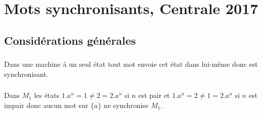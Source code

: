 
\usepackage{enumitem}
\def\numero{Révisions 4}
\def\classe{Option info MP1}
\renewcommand*{\arraystretch}{1.2}
\usetikzlibrary[automata]
\setcounter{secnumdepth}{3}
\renewcommand{\thesection}{\Roman{section}}
\renewcommand{\thesubsection}{\thesection.\Alph{subsection}}
\renewcommand{\thesubsubsection}{\thesection.\Alph{subsection}.\arabic{subsubsection})}
\camltrue

\chapter{Mots synchronisants, Centrale 2017}
\section{Considérations générales}
\subsection{}Dans une machine à un seul état tout mot envoie cet état dans lui-même donc est synchronisant.

\subsection{}
Dans $M_1$ les états $1.a^n=1\ne 2=2.a^n$ si $n$ est pair et $1.a^n=2\ne 1=2.a^n$ si $n$ est impair donc aucun mot sur $\{a\}$ ne synchronise $M_1$.
